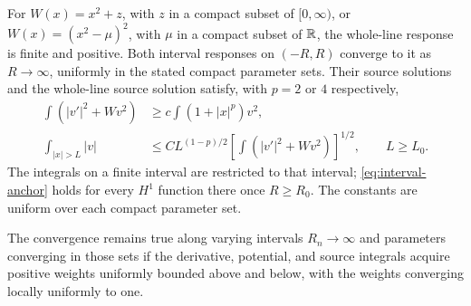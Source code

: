 \begin{lemma}
\label{lem:interval-response}
For $W(x)=x^2+z$, with $z$ in a compact subset of $[0,\infty)$, or
$W(x)=(x^2-\mu)^2$, with $\mu$ in a compact subset of $\mathbb R$, the
whole-line response is finite and positive. Both interval responses
on $(-R,R)$ converge to it as $R\to\infty$, uniformly in the stated
compact parameter sets. Their source solutions and the whole-line
source solution satisfy, with $p=2$ or $4$ respectively,
\begin{align}
 \int (|v'|^2+Wv^2)&\ge c\int(1+|x|^p)v^2,
                      \label{eq:interval-anchor}\\
 \int_{|x|>L}|v|&\le C L^{(1-p)/2}
       \left[\int (|v'|^2+Wv^2)\right]^{1/2},\qquad L\ge L_0.
                      \label{eq:interval-tail}
\end{align}
The integrals on a finite interval are restricted to that interval;
\eqref{eq:interval-anchor} holds for every $H^1$ function there once
$R\ge R_0$. The constants are uniform over each compact parameter set.

The convergence remains true along varying intervals $R_n\to\infty$
and parameters converging in those sets if the derivative, potential,
and source integrals acquire positive weights uniformly bounded above
and below, with the weights converging locally uniformly to one.
\end{lemma}
